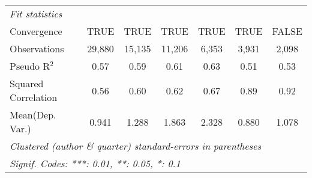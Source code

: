 \begin{tabular}{lcccccc}
   \midrule
   \emph{Fit statistics}\\
   Convergence                                                &TRUE           & TRUE          & TRUE    & TRUE    & TRUE           & FALSE\\  
   Observations                                               & 29,880        & 15,135        & 11,206  & 6,353   & 3,931          & 2,098\\  
   Pseudo R$^2$                                               & 0.57          & 0.59          & 0.61    & 0.63    & 0.51           & 0.53\\  
   Squared Correlation                                        & 0.56          & 0.60          & 0.62    & 0.67    & 0.89           & 0.92\\  
Mean(Dep. Var.) & 0.941 & 1.288 & 1.863 & 2.328 & 0.880 & 1.078 \\
   \midrule \midrule
   \multicolumn{7}{l}{\emph{Clustered (author \& quarter) standard-errors in parentheses}}\\
   \multicolumn{7}{l}{\emph{Signif. Codes: ***: 0.01, **: 0.05, *: 0.1}}\\
\end{tabular}
\par\endgroup
